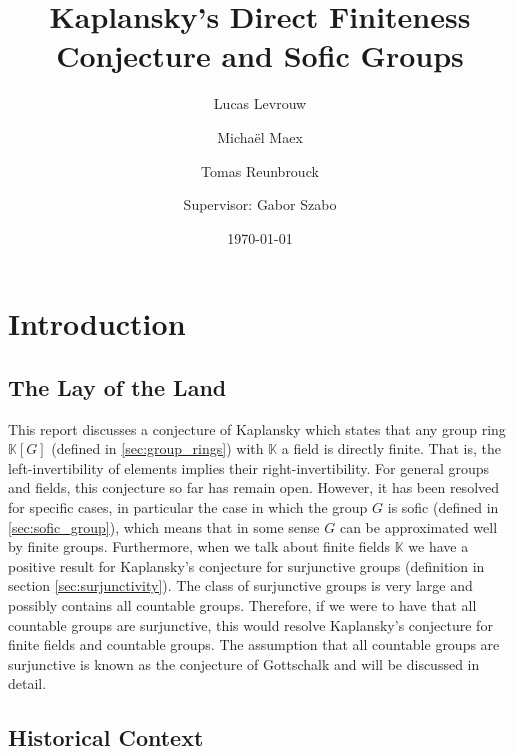\documentclass[titlepage, a4paper]{article}
\author{Lucas Levrouw \and Michaël Maex \and Tomas Reunbrouck \and Supervisor: Gabor Szabo}
\title{Kaplansky's Direct Finiteness Conjecture and Sofic Groups}
\date{\today}
\theoremstyle{theoremdd}
\theoremstyle{definitiondd}
\theoremstyle{remarkdd}
\begin{document}
    \maketitle
\begingroup
  \pagestyle{empty}
  \null
  \newpage
\endgroup
{}
\tableofcontents
\pagebreak



\section{Introduction}\label{sec:intro}

\subsection*{The Lay of the Land}

This report discusses a conjecture of Kaplansky which states that any group ring $\mathbb{K}[G]$ (defined in \cref{sec:group_rings}) with $\mathbb{K}$ a field is directly finite. That is, the left-invertibility of elements implies their right-invertibility. For general groups and fields, this conjecture so far has remain open. However, it has been resolved for specific cases, in particular the case in which the group $G$ is sofic (defined in \cref{sec:sofic_group}), which means that in some sense $G$ can be approximated well by finite groups. Furthermore, when we talk about finite fields $\mathbb{K}$ we have a positive result for Kaplansky’s conjecture for surjunctive groups (definition in section \ref{sec:surjunctivity}). The class of surjunctive groups is very large and possibly contains all countable groups. Therefore, if we were to have that all countable groups are surjunctive, this would resolve Kaplansky's conjecture for finite fields and countable groups.
The assumption that all countable groups are surjunctive is known as the conjecture of Gottschalk and will be discussed in detail.

\subsection*{Historical Context}
\end{document}
